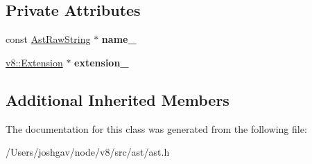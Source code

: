 \subsection*{Private Attributes}
\begin{DoxyCompactItemize}
\item 
const \hyperlink{classv8_1_1internal_1_1_ast_raw_string}{Ast\+Raw\+String} $\ast$ {\bfseries name\+\_\+}\hypertarget{classv8_1_1internal_1_1_native_function_literal_a891d1ae35f00f6c4d142dcabb524c6f1}{}\label{classv8_1_1internal_1_1_native_function_literal_a891d1ae35f00f6c4d142dcabb524c6f1}

\item 
\hyperlink{classv8_1_1_extension}{v8\+::\+Extension} $\ast$ {\bfseries extension\+\_\+}\hypertarget{classv8_1_1internal_1_1_native_function_literal_ab30ff1a3effc5e600c7a960509a9457e}{}\label{classv8_1_1internal_1_1_native_function_literal_ab30ff1a3effc5e600c7a960509a9457e}

\end{DoxyCompactItemize}
\subsection*{Additional Inherited Members}


The documentation for this class was generated from the following file\+:\begin{DoxyCompactItemize}
\item 
/\+Users/joshgav/node/v8/src/ast/ast.\+h\end{DoxyCompactItemize}
